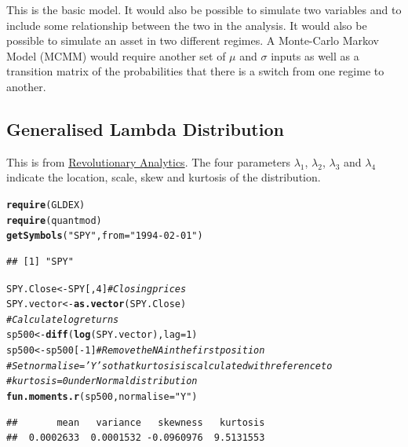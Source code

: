 \documentclass[12pt, a4paper, oneside]{article}\usepackage[]{graphicx}\usepackage[]{color}
\makeatletter
\newcommand{\hlnum}[1]{\textcolor[rgb]{0.686,0.059,0.569}{#1}}%
\newcommand{\hlstr}[1]{\textcolor[rgb]{0.192,0.494,0.8}{#1}}%
\newcommand{\hlcom}[1]{\textcolor[rgb]{0.678,0.584,0.686}{\textit{#1}}}%
\newcommand{\hlopt}[1]{\textcolor[rgb]{0,0,0}{#1}}%
\newcommand{\hlstd}[1]{\textcolor[rgb]{0.345,0.345,0.345}{#1}}%
\newcommand{\hlkwb}[1]{\textcolor[rgb]{0.69,0.353,0.396}{#1}}%
\newcommand{\hlkwc}[1]{\textcolor[rgb]{0.333,0.667,0.333}{#1}}%
\newcommand{\hlkwd}[1]{\textcolor[rgb]{0.737,0.353,0.396}{\textbf{#1}}}%
\newenvironment{kframe}{%
 \def\at@end@of@kframe{}%
 \ifinner\ifhmode%
  \def\at@end@of@kframe{\end{minipage}}%
  \begin{minipage}{\columnwidth}%
 \fi\fi%
 \def\FrameCommand##1{\hskip\@totalleftmargin \hskip-\fboxsep
 \colorbox{shadecolor}{##1}\hskip-\fboxsep
     \hskip-\linewidth \hskip-\@totalleftmargin \hskip\columnwidth}%
 \MakeFramed {\advance\hsize-\width
   \@totalleftmargin\z@ \linewidth\hsize
   \@setminipage}}%
 {\par\unskip\endMakeFramed%
 \at@end@of@kframe}
\newenvironment{knitrout}{}{} %
\makeatother
\begin{document}
This is the basic model.  It would also be possible to simulate two variables and to include some relationship between the two in the analysis.  It would also be possible to simulate an asset in two different regimes. A Monte-Carlo Markov Model (MCMM) would require another set of $\mu$ and $\sigma$ inputs as well as a transition matrix of the probabilities that there is a switch from one regime to another. 
 
\subsection{Generalised Lambda Distribution}
This is from \href{http://blog.revolutionanalytics.com/2014/02/quantitative-finance-applications-in-r-4-using-the-generalized-lambda-distribution-to-simulate-market-returns.html}{Revolutionary Analytics}.  The four parameters $\lambda_1$, $\lambda_2$, $\lambda_3$ and $\lambda_4$ indicate the location, scale, skew and kurtosis of the distribution. 

\begin{knitrout}
\color{fgcolor}\begin{kframe}
\begin{alltt}
\hlkwd{require}\hlstd{(GLDEX)}
\hlkwd{require}\hlstd{(quantmod)}
\hlkwd{getSymbols}\hlstd{(}\hlstr{"SPY"}\hlstd{,} \hlkwc{from} \hlstd{=} \hlstr{"1994-02-01"}\hlstd{)}
\end{alltt}
\begin{verbatim}
## [1] "SPY"
\end{verbatim}
\begin{alltt}
\hlstd{SPY.Close} \hlkwb{<-} \hlstd{SPY[,} \hlnum{4}\hlstd{]}  \hlcom{# Closing prices}
\hlstd{SPY.vector} \hlkwb{<-} \hlkwd{as.vector}\hlstd{(SPY.Close)}
\hlcom{# Calculate log returns}
\hlstd{sp500} \hlkwb{<-} \hlkwd{diff}\hlstd{(}\hlkwd{log}\hlstd{(SPY.vector),} \hlkwc{lag} \hlstd{=} \hlnum{1}\hlstd{)}
\hlstd{sp500} \hlkwb{<-} \hlstd{sp500[}\hlopt{-}\hlnum{1}\hlstd{]}  \hlcom{# Remove the NA in the first position}
\hlcom{# Set normalise='Y' so that kurtosis is calculated with reference to}
\hlcom{# kurtosis = 0 under Normal distribution}
\hlkwd{fun.moments.r}\hlstd{(sp500,} \hlkwc{normalise} \hlstd{=} \hlstr{"Y"}\hlstd{)}
\end{alltt}
\begin{verbatim}
##       mean   variance   skewness   kurtosis 
##  0.0002633  0.0001532 -0.0960976  9.5131553
\end{verbatim}
\end{kframe}
\end{knitrout}
\end{document}

